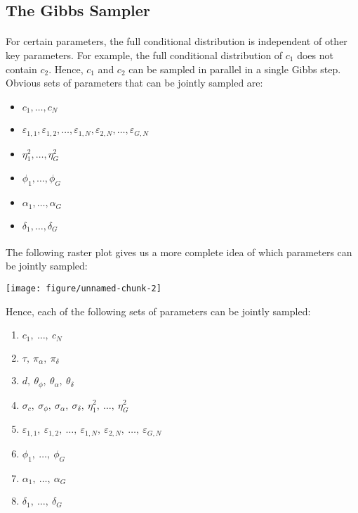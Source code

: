 \documentclass{article}\usepackage{graphicx, color}
\makeatletter
\def\maxwidth{ %
  \ifdim\Gin@nat@width>\linewidth
    \linewidth
  \else
    \Gin@nat@width
  \fi
}
\newenvironment{knitrout}{}{} %
\providecommand{\e}{\varepsilon}
\makeatother
\begin{document}
\begin{flushleft}
\section{The Gibbs Sampler}

\paragraph{} \indent For certain parameters, the full conditional distribution is independent of other key parameters. For example, the full conditional distribution of $c_1$ does not contain $c_2$. Hence, $c_1$ and $c_2$ can be sampled in parallel in a single Gibbs step. Obvious sets of parameters that can be jointly sampled are:

\begin{itemize}
\item $c_1, \ldots, c_N$
\item $\e_{1, 1}, \e_{1, 2}, \ldots, \e_{1, N}, \e_{2, N}, \ldots, \e_{G, N}$
\item $\eta_1^2, \ldots, \eta_G^2$
\item $\phi_1, \ldots, \phi_G$
\item $\alpha_1, \ldots, \alpha_G$
\item $\delta_1, \ldots, \delta_G$
\end{itemize}

\paragraph{} \indent The following raster plot gives us a more complete idea of which parameters can be jointly sampled:

\begin{knitrout}
\color{fgcolor}
\texttt{[image: figure/unnamed-chunk-2]} 

\end{knitrout}


Hence, each of the following sets of parameters can be jointly sampled:

\begin{enumerate}
\item $c_1, \ \ldots, \ c_N$
\item $\tau, \ \pi_\alpha, \ \pi_\delta$
\item $d, \ \theta_\phi, \ \theta_\alpha, \ \theta_\delta$
\item $\sigma_c, \ \sigma_\phi, \ \sigma_\alpha, \ \sigma_\delta, \ \eta_1^2, \ \ldots, \ \eta_G^2$
\item $\e_{1, 1}, \ \e_{1, 2}, \ \ldots, \ \e_{1, N}, \ \e_{2, N}, \ \ldots, \ \e_{G, N}$
\item $\phi_1, \ \ldots, \ \phi_G$
\item $\alpha_1, \ \ldots, \ \alpha_G$
\item $\delta_1, \ \ldots, \ \delta_G$
\end{enumerate}


\end{flushleft}
\end{document}
